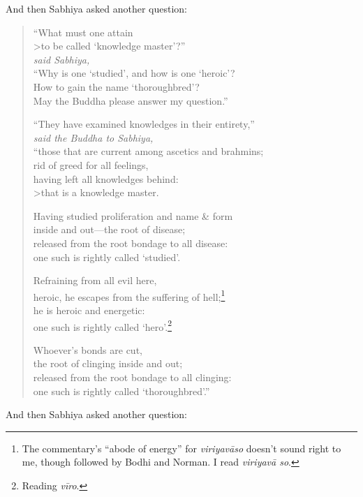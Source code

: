 \documentclass[12pt,openany]{book}%
\newcommand*{\scspeaker}[1]{\hspace{2em}\textit{#1}}
\begin{document}
And then Sabhiya asked another question: 

\begin{verse}%
“What must one attain \\>to be called ‘knowledge master’?” \\
\scspeaker{said Sabhiya, }\\
“Why is one ‘studied’, and how is one ‘heroic’? \\
How to gain the name ‘thoroughbred’? \\
May the Buddha please answer my question.” 

“They have examined knowledges in their entirety,” \\
\scspeaker{said the Buddha to Sabhiya, }\\
“those that are current among ascetics and brahmins; \\
rid of greed for all feelings, \\
having left all knowledges behind: \\>that is a knowledge master. 

Having studied proliferation and name \& form \\
inside and out—the root of disease; \\
released from the root bondage to all disease: \\
one such is rightly called ‘studied’. 

Refraining from all evil here, \\
heroic, he escapes from the suffering of hell;\footnote{The commentary’s “abode of energy” for \textit{\textsanskrit{viriyavāso}} doesn’t sound right to me, though followed by Bodhi and Norman. I read \textit{\textsanskrit{viriyavā} so}. } \\
he is heroic and energetic: \\
one such is rightly called ‘hero’.\footnote{Reading \textit{\textsanskrit{vīro}}. } 

Whoever’s bonds are cut, \\
the root of clinging inside and out; \\
released from the root bondage to all clinging: \\
one such is rightly called ‘thoroughbred’.” 

%
\end{verse}

And then Sabhiya asked another question: 
\end{document}
